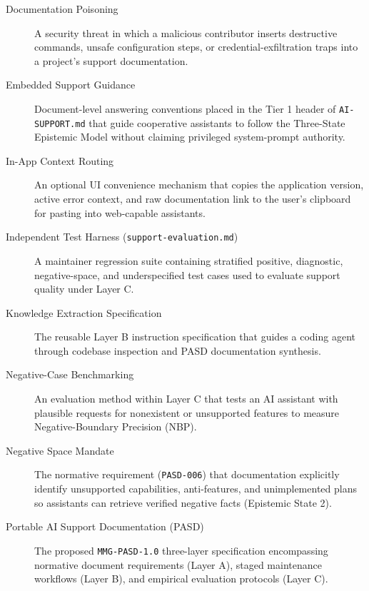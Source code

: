 \documentclass[12pt, a4paper]{article}
\begin{document}
\begin{description}
    \item[Documentation Poisoning] \label{def:poisoning}
    A security threat in which a malicious contributor inserts destructive commands, unsafe configuration steps, or credential-exfiltration traps into a project's support documentation.

    \item[Embedded Support Guidance] \label{def:preamble}
    Document-level answering conventions placed in the Tier 1 header of \texttt{AI-SUPPORT.md} that guide cooperative assistants to follow the Three-State Epistemic Model without claiming privileged system-prompt authority.

    \item[In-App Context Routing] \label{def:routing}
    An optional UI convenience mechanism that copies the application version, active error context, and raw documentation link to the user's clipboard for pasting into web-capable assistants.

    \item[Independent Test Harness (\texttt{support-evaluation.md})] \label{def:harness}
    A maintainer regression suite containing stratified positive, diagnostic, negative-space, and underspecified test cases used to evaluate support quality under Layer C.

    \item[Knowledge Extraction Specification] \label{def:payload}
    The reusable Layer B instruction specification that guides a coding agent through codebase inspection and PASD documentation synthesis.

    \item[Negative-Case Benchmarking] \label{def:neg_bench}
    An evaluation method within Layer C that tests an AI assistant with plausible requests for nonexistent or unsupported features to measure Negative-Boundary Precision (NBP).

    \item[Negative Space Mandate] \label{def:neg_space}
    The normative requirement (\texttt{PASD-006}) that documentation explicitly identify unsupported capabilities, anti-features, and unimplemented plans so assistants can retrieve verified negative facts (Epistemic State 2).

    \item[Portable AI Support Documentation (PASD)] \label{def:pasd}
    The proposed \texttt{MMG-PASD-1.0} three-layer specification encompassing normative document requirements (Layer A), staged maintenance workflows (Layer B), and empirical evaluation protocols (Layer C).


\end{description}
\end{document}
